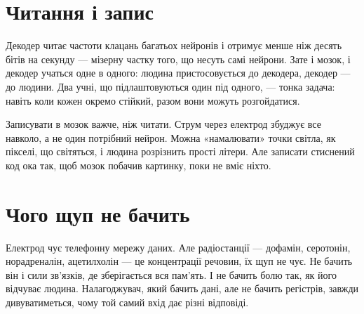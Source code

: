 \section*{Читання і запис}

Декодер читає частоти клацань багатьох нейронів і отримує менше ніж десять бітів на секунду --- мізерну частку того, що несуть самі нейрони. Зате і мозок, і декодер учаться одне в одного: людина пристосовується до декодера, декодер --- до людини. Два учні, що підлаштовуються один під одного, --- тонка задача: навіть коли кожен окремо стійкий, разом вони можуть розгойдатися.

Записувати в мозок важче, ніж читати. Струм через електрод збуджує все навколо, а не один потрібний нейрон. Можна «намалювати» точки світла, як пікселі, що світяться, і людина розрізнить прості літери. Але записати стиснений код ока так, щоб мозок побачив картинку, поки не вміє ніхто.

\section*{Чого щуп не бачить}

Електрод чує телефонну мережу даних. Але радіостанції --- дофамін, серотонін, норадреналін, ацетилхолін --- це концентрації речовин, їх щуп не чує. Не бачить він і сили зв'язків, де зберігається вся пам'ять. І не бачить болю так, як його відчуває людина. Налагоджувач, який бачить дані, але не бачить регістрів, завжди дивуватиметься, чому той самий вхід дає різні відповіді.

